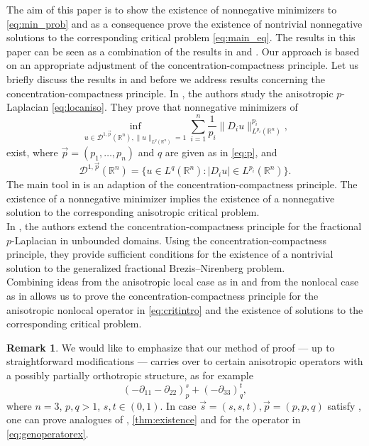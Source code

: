 \documentclass[11pt]{amsart}
\theoremstyle{plain}
\theoremstyle{definition}
\newtheorem{remark}[theorem]{Remark}
\numberwithin{equation}{section}
\newcommand{\R}{\mathbb{R}}
\begin{document}
The aim of this paper is to show the existence of nonnegative minimizers to \eqref{eq:min_prob} and as a consequence prove the existence of nontrivial nonnegative solutions to the corresponding critical problem \eqref{eq:main_eq}. 
The results in this paper can be seen as a combination of the results in \cite{EHR07} and \cite{BSS18}. Our approach is based on an appropriate adjustment of the concentration-compactness principle. Let us briefly discuss the results in \cite{EHR07} and \cite{BSS18} before we address results concerning the concentration-compactness principle.
In \cite{EHR07}, the authors study the anisotropic $p$-Laplacian \eqref{eq:locaniso}. They prove that nonnegative minimizers of
\begin{equation*}
\inf_{u \in \mathcal{D}^{1,\vec{p}}(\mathbb{R}^n), \|u\|_{L^{q}(\mathbb{R}^n)}=1} \sum_{i=1}^n \frac{1}{p_i} \|D_i u\|_{L^{p_i}(\R^n)}^{p_i},
\end{equation*}
exist, where $\vec{p} = (p_1, \dots, p_n)$ and $q$ are given as in \eqref{eq:p}, and
\begin{equation*}
\mathcal{D}^{1,\vec{p}}(\mathbb{R}^n) = \lbrace u \in L^{q}(\mathbb{R}^n): |D_i u| \in L^{p_i}(\R^n) \rbrace.
\end{equation*}
The main tool in \cite{EHR07} is an adaption of the concentration-compactness principle. The existence of a nonnegative minimizer implies the existence of a nonnegative solution to the corresponding anisotropic critical problem. \\
In \cite{BSS18}, the authors extend the concentration-compactness principle for the fractional \\
$p$-Laplacian in unbounded domains. Using the concentration-compactness principle, they provide sufficient conditions for the existence of a nontrivial solution to the generalized fractional Brezis--Nirenberg problem.\\ Combining ideas from the anisotropic local case as in \cite{EHR07} and from the nonlocal case as in \cite{BSS18} allows us to prove the concentration-compactness principle for the anisotropic nonlocal operator in \eqref{eq:critintro} and the existence of solutions to the corresponding critical problem.

\begin{remark}
We would like to emphasize that our method of proof --- up to straightforward modifications --- carries over to certain anisotropic operators with a possibly partially orthotropic structure, as for example
\begin{equation}
\label{eq:genoperatorex}
\left( - \partial_{11} - \partial_{22}\right)^{s}_{p} + (-\partial_{33})^{t}_{q},
\end{equation}
where $n = 3$, $p,q > 1$, $s,t \in (0,1)$. In case $\vec{s} = (s,s,t), \vec{p} = (p,p,q)$ satisfy , one can prove analogues of  , \autoref{thm:existence} and  for the operator in \eqref{eq:genoperatorex}.
\end{remark}
\end{document}
